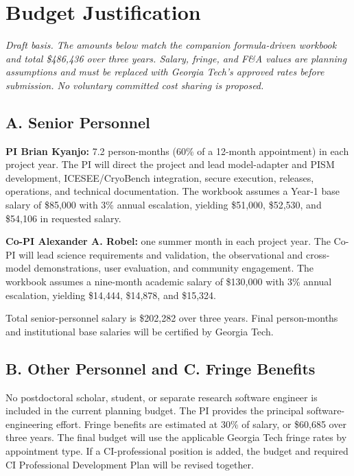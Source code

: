 \section*{Budget Justification}

\textit{Draft basis. The amounts below match the companion formula-driven
workbook and total \$486,436 over three years. Salary, fringe, and F\&A values
are planning assumptions and must be replaced with Georgia Tech's approved
rates before submission. No voluntary committed cost sharing is proposed.}

\subsection*{A. Senior Personnel}

\textbf{PI Brian Kyanjo:} 7.2 person-months (60\% of a 12-month appointment)
in each project year. The PI will direct the project and lead model-adapter and
PISM development, ICESEE/CryoBench integration, secure execution, releases,
operations, and technical documentation. The workbook assumes a Year-1 base
salary of \$85,000 with 3\% annual escalation, yielding \$51,000, \$52,530,
and \$54,106 in requested salary.

\textbf{Co-PI Alexander A. Robel:} one summer month in each project year. The
Co-PI will lead science requirements and validation, the observational and
cross-model demonstrations, user evaluation, and community engagement. The
workbook assumes a nine-month academic salary of \$130,000 with 3\% annual
escalation, yielding \$14,444, \$14,878, and \$15,324.

Total senior-personnel salary is \$202,282 over three years. Final person-months
and institutional base salaries will be certified by Georgia Tech.

\subsection*{B. Other Personnel and C. Fringe Benefits}

No postdoctoral scholar, student, or separate research software engineer is
included in the current planning budget. The PI provides the principal
software-engineering effort. Fringe benefits are estimated at 30\% of salary,
or \$60,685 over three years. The final budget will use the applicable Georgia
Tech fringe rates by appointment type. If a CI-professional position is added,
the budget and required CI Professional Development Plan will be revised
together.

